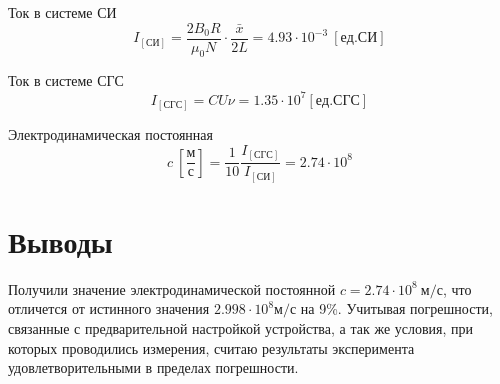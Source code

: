 \documentclass{article}
\begin{document}
Ток в системе СИ
\begin{equation*}
    I_{[СИ]} = \frac{2 B_0 R}{\mu_0 N} \cdot \frac{\bar{x}}{2L} = 4.93 \cdot 10^{-3}\ [ед. СИ]
\end{equation*}

Ток в системе СГС
\begin{equation*}
    I_{[СГС]} = CU\nu = 1.35 \cdot 10^7 [ед. СГС]
\end{equation*}

Электродинамическая постоянная
\begin{equation*}
    c\ \left[\frac{м}{с}\right] = \frac{1}{10} \frac{I_{[СГС]}}{I_{[СИ]}}=2.74\cdot10^8
\end{equation*}

\section{Выводы}
Получили значение электродинамической постоянной $c=2.74 \cdot 10^8\ м/с$, что отличется
от истинного значения $2.998 \cdot 10^8 м/с$ на 9\%. Учитывая погрешности, связанные с
предварительной настройкой устройства, а так же условия, при которых проводились
измерения, считаю результаты эксперимента удовлетворительными в пределах погрешности.
\end{document}
